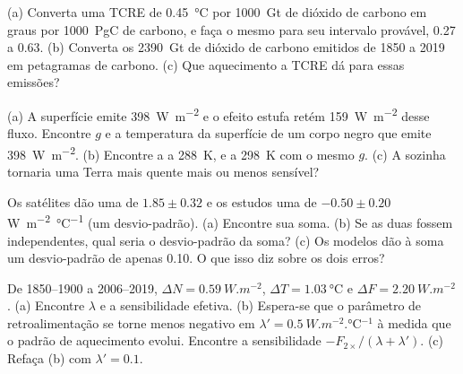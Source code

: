 \begin{exercise}[$\star$]\label{exo:b2:anthropogenic-climate-change:4}
(a) Converta uma TCRE de \qty{0.45}{\celsius} por \qty{1000}{Gt} de dióxido de carbono em graus por
\qty{1000}{PgC} de carbono, e faça o mesmo para seu intervalo provável, 0.27 a 0.63. (b) Converta os
\qty{2390}{Gt} de dióxido de carbono emitidos de 1850 a 2019 em petagramas de carbono. (c) Que
aquecimento a TCRE dá para essas emissões?
\end{exercise}

\begin{exercise}[$\star\star$]\label{exo:b2:anthropogenic-climate-change:5}
(a) A superfície emite \qty{398}{W.m^{-2}} e o efeito estufa retém \qty{159}{W.m^{-2}} desse
fluxo. Encontre $g$ e a temperatura da superfície de um corpo negro que emite \qty{398}{W.m^{-2}}. (b) Encontre a
 a \qty{288}{K}, e a \qty{298}{K} com o mesmo $g$. (c) A 
sozinha tornaria uma Terra mais quente mais ou menos sensível?
\end{exercise}

\begin{exercise}[$\star\star$]\label{exo:b2:anthropogenic-climate-change:6}
Os satélites dão uma  de $1.85 \pm 0.32$ e os estudos uma  de
$-0.50 \pm 0.20$ \unit{W.m^{-2}.\celsius^{-1}} (um desvio-padrão). (a) Encontre sua soma.
(b) Se as duas fossem independentes, qual seria o desvio-padrão da soma? (c) Os modelos
dão à soma um desvio-padrão de apenas \num{0.10}. O que isso diz sobre os dois erros?
\end{exercise}

\begin{exercise}[$\star\star$]\label{exo:b2:anthropogenic-climate-change:7}
De 1850--1900 a 2006--2019, $\Delta N = \qty{0.59}{W.m^{-2}}$, $\Delta T = \qty{1.03}{\celsius}$
e $\Delta F = \qty{2.20}{W.m^{-2}}$. (a) Encontre $\lambda$ e a sensibilidade efetiva. (b) Espera-se que o
parâmetro de retroalimentação se torne menos negativo em $\lambda' = \qty{0.5}{W.m^{-2}.\celsius^{-1}}$
à medida que o padrão de aquecimento evolui. Encontre a sensibilidade $-F_{2\times}/(\lambda + \lambda')$.
(c) Refaça (b) com $\lambda' = 0.1$.
\end{exercise}

